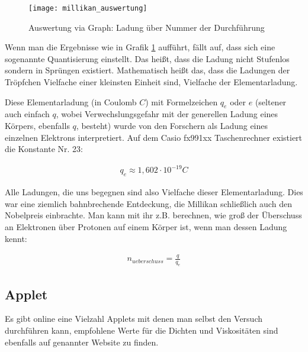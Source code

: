 \begin{figure}[h!]
	\center
	\texttt{[image: millikan\_auswertung]}
	\caption{Auswertung via Graph: Ladung über Nummer der Durchführung}
	\vspace*{-10pt}
	\label{fig:millikan_auswertung}
\end{figure}

Wenn man die Ergebnisse wie in Grafik \ref{fig:millikan_auswertung} aufführt, fällt auf, dass sich eine sogenannte Quantisierung einstellt. Das heißt, dass die Ladung nicht \glqq Stufenlos\grqq{} sondern in \glqq Sprüngen\grqq{} existiert. Mathematisch heißt das, dass die Ladungen der Tröpfchen Vielfache einer kleinsten Einheit sind, Vielfache der \glqq Elementarladung\grqq .

Diese Elementarladung (in Coulomb $C$) mit Formelzeichen $q_e$ oder $e$ (seltener auch einfach $q$, wobei Verwechslungsgefahr mit der generellen Ladung eines Körpers, ebenfalls $q$, besteht) wurde von den Forschern als Ladung eines einzelnen Elektrons interpretiert. Auf dem Casio fx991xx Taschenrechner existiert die Konstante Nr. 23:

\begin{align}
	q_e \approx 1,602 \cdot 10^{-19} C
\end{align}

Alle Ladungen, die uns begegnen sind also Vielfache dieser Elementarladung. Dies war eine ziemlich bahnbrechende Entdeckung, die Millikan schließlich auch den Nobelpreis einbrachte. Man kann mit ihr z.B. berechnen, wie groß der Überschuss an Elektronen über Protonen auf einem Körper ist, wenn man dessen Ladung kennt:

\begin{align}
	n_{ueberschuss} = \frac{q}{q_e}
\end{align}


\subsection{Applet}

Es gibt online eine Vielzahl Applets mit denen man selbst den Versuch durchführen kann, empfohlene Werte für die Dichten und Viskositäten sind ebenfalls auf genannter Website zu finden.




